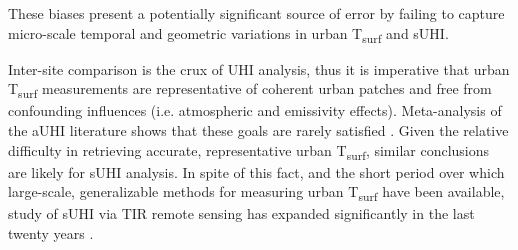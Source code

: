 \begin{bibunit}
\noindent These biases present a potentially significant source of error by failing to capture micro-scale temporal and geometric variations in urban T\textsubscript{surf} and sUHI. 

Inter-site comparison is the crux of UHI analysis, thus it is imperative that urban T\textsubscript{surf} measurements are representative of coherent urban patches and free from confounding influences (i.e. atmospheric and emissivity effects). Meta-analysis of the aUHI literature shows that these goals are rarely satisfied \citep{Stewart2011}. Given the relative difficulty in retrieving accurate, representative urban T\textsubscript{surf}, similar conclusions are likely for sUHI analysis. In spite of this fact, and the short period over which large-scale, generalizable methods for measuring urban T\textsubscript{surf} have been available, study of sUHI via TIR remote sensing has expanded significantly in the last twenty years \citep{Peng2012,Voogt2003}. 



\end{bibunit}

